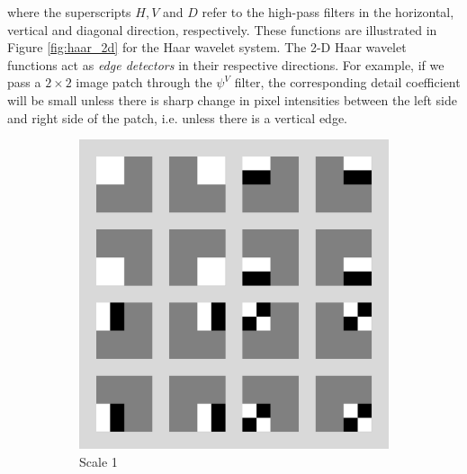 where the superscripts $H,V$ and $D$ refer to the high-pass filters in the horizontal, vertical and diagonal direction, respectively.
These functions are illustrated in Figure \ref{fig:haar_2d} for the Haar wavelet system.
The 2-D Haar wavelet functions act as \emph{edge detectors} in their respective directions.
For example, if we pass a $2\times 2$ image patch through the $\psi^V$ filter, the corresponding detail coefficient will be small unless there is sharp change in pixel intensities between the left side and right side of the patch, i.e. unless there is a vertical edge.

\begin{figure}
\centering
\begin{subfigure}{0.4\textwidth}
  \includegraphics[width=\textwidth]{Chapter3/Images/haar2_scale1.png}
  \caption{Scale 1}
\end{subfigure}
\begin{subfigure}{0.4\textwidth}

\end{subfigure}
\end{figure}
